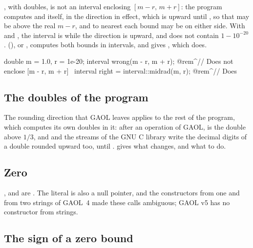 \documentclass[12pt,a4paper,twoside,openright]{book}
\begin{document}
, with doubles, is not an interval enclosing
$[m-r,\,m+r]$: the program computes  and  itself, in
the direction in effect, which is upward until , so that
 may be above the real $m-r$, and to nearest each bound may be on
either side. With  and , the interval is
 while the direction is upward, and does not contain
$1-10^{-20}$.  (),
or , computes both bounds in intervals, and gives
, which does.\newinvfive

\begin{example}
double m = 1.0, r = 1e-20;
interval wrong(m - r, m + r);  @rem^// Does not enclose [m - r, m + r]~
interval right = interval::midrad(m, r);  @rem^// Does~
\end{example}

\subsection{The doubles of the program}

The rounding direction that GAOL leaves applies to the rest of the program,
which computes its own doubles in it: after an operation of GAOL,
 is the double above $1/3$, and  and the
streams of the GNU C library write the decimal digits of a double rounded
upward too, until .  gives what
changes, and what to do.\newinvfive

\subsection{Zero}
%

,  and 
are . The literal  is also a null pointer, and the
constructors from one and from two strings of GAOL~4 made these calls
ambiguous; GAOL v5 has no constructor from strings.\newinvfive

\subsection{The sign of a zero bound}\label{sec:zero-sign}
%
\end{document}
